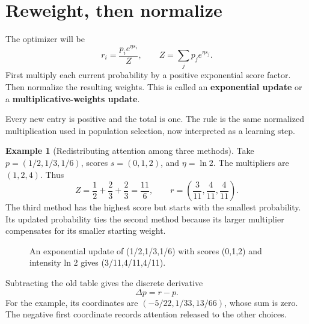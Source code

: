 \documentclass[11pt,oneside,openany]{book}
\theoremstyle{definition}
\newtheorem{example}{Example}[chapter]
\theoremstyle{remark}
\numberwithin{equation}{chapter}
\begin{document}
\section{Reweight, then normalize}\label{ch09-reweight-then-normalize}

The optimizer will be \[\boxed{r_i=\frac{p_i e^{\eta s_i}}{Z},\qquad
Z=\sum_j p_j e^{\eta s_j}.}\] First multiply each current probability by a positive exponential score factor. Then normalize the resulting weights. This is called an \textbf{exponential update} or a \textbf{multiplicative-weights update}.

Every new entry is positive and the total is one. The rule is the same normalized multiplication used in population selection, now interpreted as a learning step.

\begin{example}[Redistributing attention among three methods]

Take \(p=(1/2,1/3,1/6)\), scores \(s=(0,1,2)\), and \(\eta=\ln2\). The multipliers are \((1,2,4)\). Thus \[Z=\frac12+\frac23+\frac23=\frac{11}6,\qquad
r=\left(\frac3{11},\frac4{11},\frac4{11}\right).\] The third method has the highest score but starts with the smallest probability. Its updated probability ties the second method because its larger multiplier compensates for its smaller starting weight.

\end{example}

\begin{figure}[htbp]\centering
{}
\caption{An exponential update of (1/2,1/3,1/6) with scores (0,1,2) and intensity ln 2 gives (3/11,4/11,4/11).}\end{figure}

Subtracting the old table gives the discrete derivative \[\Delta p=r-p.\] For the example, its coordinates are \((-5/22,1/33,13/66)\), whose sum is zero. The negative first coordinate records attention released to the other choices.
\end{document}
